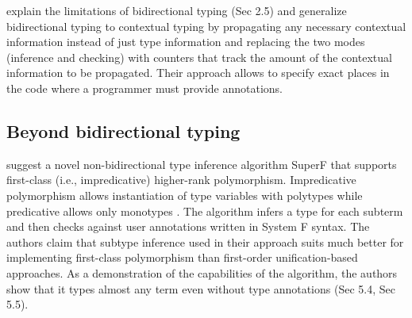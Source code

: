 \citeauthor{xue-contextual-2024} \cite{xue-contextual-2024} explain the limitations of bidirectional typing (Sec 2.5) and generalize bidirectional typing to contextual typing by propagating any necessary contextual information instead of just type information and replacing the two modes (inference and checking) with counters that track the amount of the contextual information to be propagated. Their approach allows to specify exact places in the code where a programmer must provide annotations.

\subsection{Beyond bidirectional typing}

\citeauthor{parreaux-when-2024} suggest a novel non-bidirectional type inference algorithm SuperF that supports first-class (i.e., impredicative) higher-rank polymorphism. Impredicative polymorphism allows instantiation of type variables with polytypes while predicative allows only monotypes \cite[Sec 3.4]{jones-practical-2007}. The algorithm infers a type for each subterm and then checks against user annotations written in System F syntax. The authors claim that subtype inference used in their approach suits much better for implementing first-class polymorphism than first-order unification-based approaches. As a demonstration of the capabilities of the algorithm, the authors show that it types almost any term even without type annotations (Sec 5.4, Sec 5.5).
